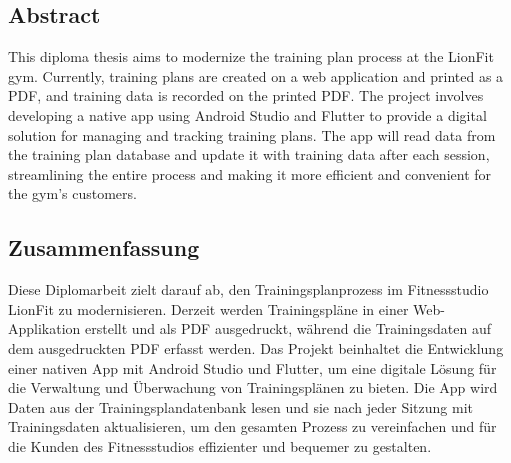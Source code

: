 \begin{spacing}{1}
    \chapter*{Abstract}
\end{spacing}
This diploma thesis aims to modernize the training plan process at the LionFit gym. 
Currently, training plans are created on a web application and printed as a PDF, and training data 
is recorded on the printed PDF. The project involves developing a native app using Android Studio and Flutter 
to provide a digital solution for managing and tracking training plans. The app will read data from the training 
plan database and update it with training data after each session, streamlining the entire process and making it 
more efficient and convenient for the gym's customers.
\newpage
\begin{spacing}{1}
    \chapter*{Zusammenfassung}
\end{spacing}
Diese Diplomarbeit zielt darauf ab, den Trainingsplanprozess im Fitnessstudio LionFit zu modernisieren. 
Derzeit werden Trainingspläne in einer Web-Applikation erstellt und als PDF ausgedruckt, 
während die Trainingsdaten auf dem ausgedruckten PDF erfasst werden. Das Projekt beinhaltet 
die Entwicklung einer nativen App mit Android Studio und Flutter, um eine digitale Lösung für 
die Verwaltung und Überwachung von Trainingsplänen zu bieten. Die App wird Daten aus der 
Trainingsplandatenbank lesen und sie nach jeder Sitzung mit Trainingsdaten aktualisieren, 
um den gesamten Prozess zu vereinfachen und für die Kunden des Fitnessstudios effizienter und bequemer zu gestalten.

